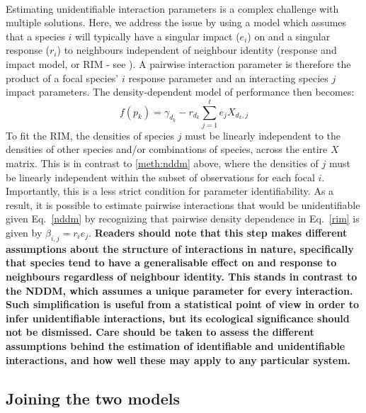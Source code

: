 \documentclass[a4,12pt]{article}
\begin{document}
\begin{refsection}
    \paragraph{}
    Estimating unidentifiable interaction parameters is a complex challenge with multiple solutions. Here, we address the issue by using a model which assumes that a species $i$ will typically have a singular impact ($e_i$) on and a singular response ($r_i$) to neighbours independent of neighbour identity (response and impact model, or RIM - see \cite{Godoy2014b}). A pairwise interaction parameter is therefore the product of a focal species' $i$ response parameter and an interacting species $j$ impact parameters. The density-dependent model of performance then becomes:
        \begin{equation}
        f(p_{k}) = \gamma_{d_k} - r_{d_k} \sum_{j=1}^{t} e_{j} X_{d_k, j}
        \label{rim}
        \end{equation}
    To fit the RIM, the densities of species $j$ must be linearly independent to the densities of other species and/or combinations of species, across the entire $X$ matrix. This is in contrast to \ref{meth:nddm} above, where the densities of $j$ must be linearly independent within the subset of observations for each focal $i$. Importantly, this is a less strict condition for parameter identifiability. As a result, it is possible to estimate pairwise interactions that would be unidentifiable given Eq.~\ref{nddm} by recognizing that pairwise density dependence in Eq.~\ref{rim} is given by $\beta_{i, j} = r_{i} e_{j}$. \textbf{Readers should note that this step makes different assumptions about the structure of interactions in nature, specifically that species tend to have a generalisable effect on and response to neighbours regardless of neighbour identity. This stands in contrast to the NDDM, which assumes a unique parameter for every interaction. Such simplification is useful from a statistical point of view in order to infer unidentifiable interactions, but its ecological significance should not be dismissed. Care should be taken to assess the different assumptions behind the estimation of identifiable and unidentifiable interactions, and how well these may apply to any particular system.}


    \subsection{Joining the two models}
    \label{meth:addlog}


\end{refsection}
\end{document}
